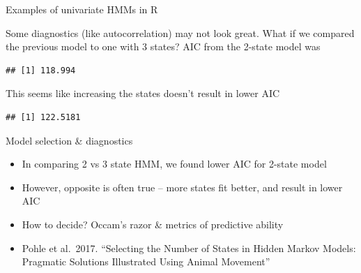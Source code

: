\documentclass[
  ignorenonframetext,
]{beamer}
\newenvironment{Shaded}{\begin{snugshade}}{\end{snugshade}}
\newcommand{\DataTypeTok}[1]{\textcolor[rgb]{0.13,0.29,0.53}{#1}}
\newcommand{\DecValTok}[1]{\textcolor[rgb]{0.00,0.00,0.81}{#1}}
\newcommand{\KeywordTok}[1]{\textcolor[rgb]{0.13,0.29,0.53}{\textbf{#1}}}
\newcommand{\NormalTok}[1]{#1}
\newcommand{\OperatorTok}[1]{\textcolor[rgb]{0.81,0.36,0.00}{\textbf{#1}}}
\newcommand{\StringTok}[1]{\textcolor[rgb]{0.31,0.60,0.02}{#1}}
\begin{document}
\begin{frame}[fragile]{Examples of univariate HMMs in R}
\protect\hypertarget{examples-of-univariate-hmms-in-r-21}{}

Some diagnostics (like autocorrelation) may not look great. What if we
compared the previous model to one with 3 states? AIC from the 2-state
model was

\begin{verbatim}
## [1] 118.994
\end{verbatim}

\begin{Shaded}
\end{Shaded}

This seems like increasing the states doesn't result in lower AIC

\begin{verbatim}
## [1] 122.5181
\end{verbatim}

\end{frame}

\begin{frame}{Model selection \& diagnostics}
\protect\hypertarget{model-selection-diagnostics}{}

\begin{itemize}
\item
  In comparing 2 vs 3 state HMM, we found lower AIC for 2-state model
\item
  However, opposite is often true -- more states fit better, and result
  in lower AIC
\item
  How to decide? Occam's razor \& metrics of predictive ability
\item
  Pohle et al.~2017. ``Selecting the Number of States in Hidden Markov
  Models: Pragmatic Solutions Illustrated Using Animal Movement''
\end{itemize}

\end{frame}
\end{document}
